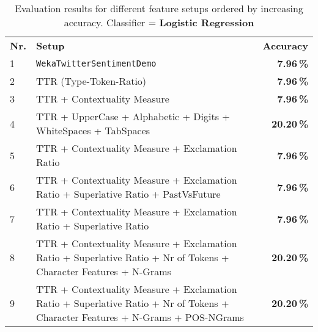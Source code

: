 \documentclass[journal, a4paper]{IEEEtran}
\begin{document}
\begin{table}[!hbt]
	\begin{center}
		\caption{Evaluation results for different feature setups ordered by increasing accuracy.
		Classifier = \textbf{Logistic Regression}}
		\label{tab:results-logistic}
		\begin{tabularx}{80mm}{| l | X | r |}
			\hline
			\rowcolor{lightgray}
			\multicolumn{3}{| c |}{\textbf{Logistic Regression}} 								\\ \hline
			\rowcolor{lightgray}
			\textbf{Nr.}		&	\textbf{Setup}					& \textbf{Accuracy}		\\ \hline\hline
			1			&	\texttt{WekaTwitterSentimentDemo}	& \textbf{7.96\,\%}		\\ \hline
			2			&	TTR (Type-Token-Ratio)				& \textbf{7.96\,\%}		\\ \hline
			3			&	TTR + Contextuality Measure			& \textbf{7.96\,\%}		\\ \hline
			4			&	TTR + UpperCase + Alphabetic + Digits + WhiteSpaces + TabSpaces
																& \textbf{20.20\,\%}		\\ \hline
			5			& 	TTR + Contextuality Measure + Exclamation Ratio
																& \textbf{7.96\,\%}		\\ \hline
			6			&	TTR + Contextuality Measure + Exclamation Ratio + Superlative Ratio + PastVsFuture 
																& \textbf{7.96\,\%}		\\ \hline
			7			&	TTR + Contextuality Measure + Exclamation Ratio + Superlative Ratio 
																& \textbf{7.96\,\%}		\\ \hline
			8			&	TTR + Contextuality Measure + Exclamation Ratio + Superlative Ratio +
							Nr of Tokens + Character Features + N-Grams
																& \textbf{20.20\,\%}		\\ \hline
			9			&	TTR + Contextuality Measure + Exclamation Ratio + Superlative Ratio +
							Nr of Tokens + Character Features + N-Grams + POS-NGrams
																& \textbf{20.20\,\%}		\\ \hline
			\hline
		\end{tabularx}
	\end{center}
\end{table}
\end{document}
